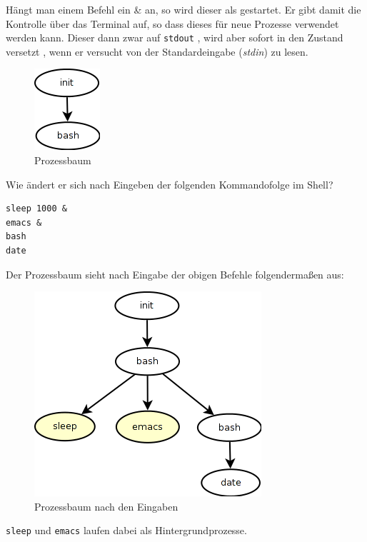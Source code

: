\begin{answer}
Hängt man einem Befehl ein \& an, so wird dieser als  gestartet. Er gibt damit die Kontrolle über das Terminal auf, so dass dieses für neue Prozesse verwendet werden kann. Dieser  dann zwar auf \texttt{stdout} , wird aber sofort in den Zustand  versetzt , wenn er versucht von der Standardeingabe (\textit{stdin}) zu lesen.
\end{answer}

\begin{multilinequestion}

\begin{figure}[H]
  \caption{Prozessbaum}
  \centering
    \includegraphics[scale=0.70]{images/process-tree01}
\end{figure}

Wie ändert er sich nach Eingeben der folgenden Kommandofolge im Shell?

\begin{lstlisting}
sleep 1000 &
emacs &
bash
date
\end{lstlisting}

\end{multilinequestion}

\begin{answer}
Der Prozessbaum sieht nach Eingabe der obigen Befehle folgendermaßen aus:
\begin{figure}[H]
  \caption{Prozessbaum nach den Eingaben}
  \centering
    \includegraphics[scale=0.70]{images/process-tree02}
\end{figure}
\texttt{sleep} und \texttt{emacs} laufen dabei als Hintergrundprozesse.
\end{answer}


